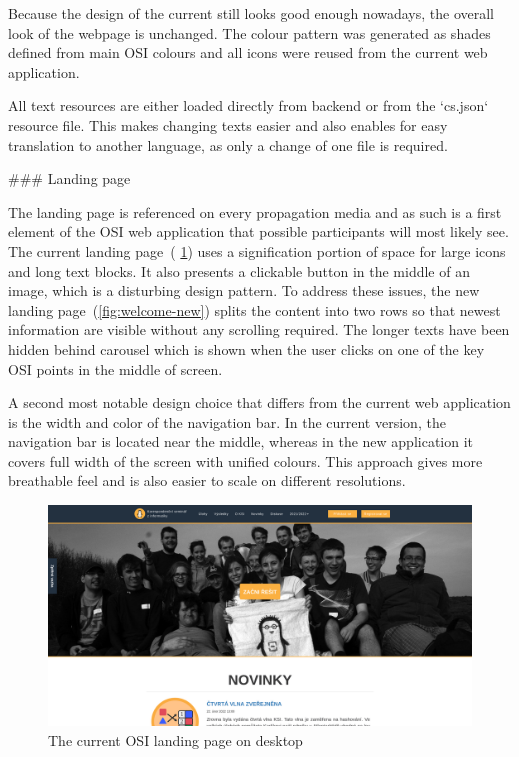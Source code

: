 \documentclass[
  digital, %
  oneside, %
  lof,     %
  lot,     %
]{fithesis4}
\begin{document}
{Because the design of the current still looks good enough nowadays, the overall look of the webpage is unchanged. The colour pattern was generated as shades defined from main OSI colours and all icons were reused from the current web application.

All text resources are either loaded directly from backend or from the `cs.json` resource file. This makes changing texts easier and also enables for easy translation to another language, as only a change of one file is required.

### Landing page

The landing page is referenced on every propagation media and as such is a first element of the OSI web application that possible participants will most likely see. The current landing page~( \ref{fig:welcome-curr}) uses a signification portion of space for large icons and long text blocks. It also presents a clickable button in the middle of an image, which is a disturbing design pattern. To address these issues, the new landing page~(\ref{fig:welcome-new}) splits the content into two rows so that newest information are visible without any scrolling required. The longer texts have been hidden behind carousel which is shown when the user clicks on one of the key OSI points in the middle of screen.

A second most notable design choice that differs from the current web application is the width and color of the navigation bar. In the current version, the navigation bar is located near the middle, whereas in the new application it covers full width of the screen with unified colours. This approach gives more breathable feel and is also easier to scale on different resolutions.

\begin{figure}
\includegraphics[width=\textwidth]{assets/img/welcome_curr}
\caption{The current OSI landing page on desktop}
\label{fig:welcome-curr}
\end{figure}

}
\end{document}
